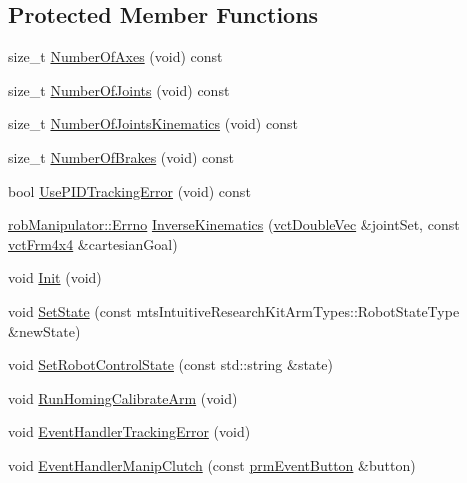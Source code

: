 \subsection*{Protected Member Functions}
\begin{DoxyCompactItemize}
\item 
size\-\_\-t \hyperlink{classmts_intuitive_research_kit_e_c_m_a80fe83ee8ce1c474ca1ebbaa02a6cc32}{Number\-Of\-Axes} (void) const 
\item 
size\-\_\-t \hyperlink{classmts_intuitive_research_kit_e_c_m_a1a58a2415e93713fb2f422c0d3405115}{Number\-Of\-Joints} (void) const 
\item 
size\-\_\-t \hyperlink{classmts_intuitive_research_kit_e_c_m_a2ae319d27bd3ceadfe4bdce0fb920dcf}{Number\-Of\-Joints\-Kinematics} (void) const 
\item 
size\-\_\-t \hyperlink{classmts_intuitive_research_kit_e_c_m_a13c7bdfecbb523995b0a78debbe8dbab}{Number\-Of\-Brakes} (void) const 
\item 
bool \hyperlink{classmts_intuitive_research_kit_e_c_m_ae6af0b7292da7676cbcb10ae7b27b2ef}{Use\-P\-I\-D\-Tracking\-Error} (void) const 
\item 
\hyperlink{classrob_manipulator_a7bbb51cdb81c9c681075a9274ca0cdc0}{rob\-Manipulator\-::\-Errno} \hyperlink{classmts_intuitive_research_kit_e_c_m_a151fecd26c5cb25576a72c4632ed3d79}{Inverse\-Kinematics} (\hyperlink{vct_dynamic_vector_types_8h_ade4b3068c86fb88f41af2e5187e491c2}{vct\-Double\-Vec} \&joint\-Set, const \hyperlink{vct_transformation_types_8h_a33da47f4deb2556b37a69a2c44b29d75}{vct\-Frm4x4} \&cartesian\-Goal)
\item 
void \hyperlink{classmts_intuitive_research_kit_e_c_m_a75f7468b431ea7912638bc78a0419589}{Init} (void)
\item 
void \hyperlink{classmts_intuitive_research_kit_e_c_m_ac44c187c7f6559cbeced4b77df2af902}{Set\-State} (const mts\-Intuitive\-Research\-Kit\-Arm\-Types\-::\-Robot\-State\-Type \&new\-State)
\item 
void \hyperlink{classmts_intuitive_research_kit_e_c_m_ac98464cd78890b5f173156d29b962e98}{Set\-Robot\-Control\-State} (const std\-::string \&state)
\item 
void \hyperlink{classmts_intuitive_research_kit_e_c_m_ab16dee65415c9d75ac1cd6617c61293b}{Run\-Homing\-Calibrate\-Arm} (void)
\item 
void \hyperlink{classmts_intuitive_research_kit_e_c_m_a266ed9b7ef180009b3b0b7dbea37440c}{Event\-Handler\-Tracking\-Error} (void)
\item 
void \hyperlink{classmts_intuitive_research_kit_e_c_m_a224c381c3997489e2cfcdb4fa2e64cbc}{Event\-Handler\-Manip\-Clutch} (const \hyperlink{classprm_event_button}{prm\-Event\-Button} \&button)
\end{DoxyCompactItemize}
